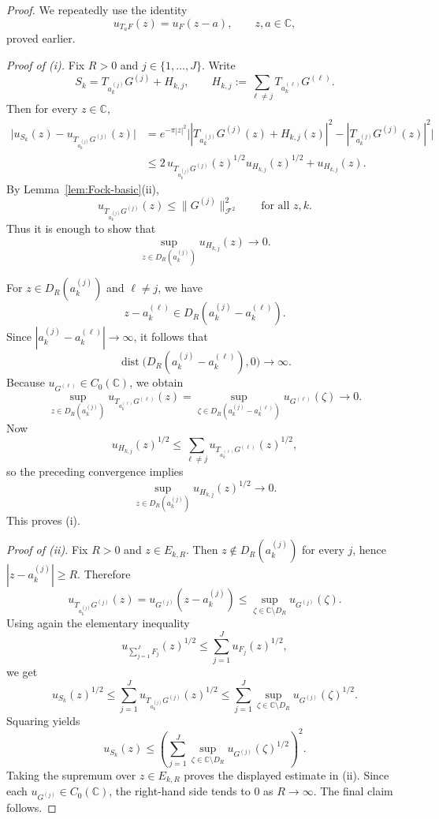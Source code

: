 \documentclass[a4paper,11pt,reqno]{amsart}
\numberwithin{equation}{section}
\theoremstyle{plain} %
\theoremstyle{definition} %
\theoremstyle{remark}
\newcommand{\C}{\mathbb{C}}
\begin{document}
\begin{proof}
We repeatedly use the identity
\[
u_{T_a F}(z)=u_F(z-a),
\qquad z,a\in \C,
\]
proved earlier.

\medskip
\noindent\emph{Proof of (i).}
Fix \(R>0\) and \(j\in\{1,\dots,J\}\). Write
\[
S_k=T_{a_k^{(j)}}G^{(j)}+H_{k,j},
\qquad
H_{k,j}:=\sum_{\ell\neq j} T_{a_k^{(\ell)}}G^{(\ell)}.
\]
Then for every \(z\in \C\),
\begin{align*}
\big|u_{S_k}(z)-u_{T_{a_k^{(j)}}G^{(j)}}(z)\big|
&=
e^{-\pi |z|^2}
\big||T_{a_k^{(j)}}G^{(j)}(z)+H_{k,j}(z)|^2-|T_{a_k^{(j)}}G^{(j)}(z)|^2\big| \\
&\le
2\,u_{T_{a_k^{(j)}}G^{(j)}}(z)^{1/2}u_{H_{k,j}}(z)^{1/2}
+u_{H_{k,j}}(z).
\end{align*}
By Lemma~\ref{lem:Fock-basic}(ii),
\[
u_{T_{a_k^{(j)}}G^{(j)}}(z)\le \|G^{(j)}\|_{\mathcal F^2}^2
\qquad \text{for all }z,k.
\]
Thus it is enough to show that
\[
\sup_{z\in D_R(a_k^{(j)})} u_{H_{k,j}}(z)\to 0.
\]

For \(z\in D_R(a_k^{(j)})\) and \(\ell\neq j\), we have
\[
z-a_k^{(\ell)}\in D_R(a_k^{(j)}-a_k^{(\ell)}).
\]
Since \(|a_k^{(j)}-a_k^{(\ell)}|\to\infty\), it follows that
\[
\operatorname{dist}\big(D_R(a_k^{(j)}-a_k^{(\ell)}),0\big)\to\infty.
\]
Because \(u_{G^{(\ell)}}\in C_0(\C)\), we obtain
\[
\sup_{z\in D_R(a_k^{(j)})} u_{T_{a_k^{(\ell)}}G^{(\ell)}}(z)
=
\sup_{\zeta\in D_R(a_k^{(j)}-a_k^{(\ell)})} u_{G^{(\ell)}}(\zeta)
\to 0.
\]
Now
\[
u_{H_{k,j}}(z)^{1/2}
\le
\sum_{\ell\neq j} u_{T_{a_k^{(\ell)}}G^{(\ell)}}(z)^{1/2},
\]
so the preceding convergence implies
\[
\sup_{z\in D_R(a_k^{(j)})} u_{H_{k,j}}(z)^{1/2}\to 0.
\]
This proves (i).

\medskip
\noindent\emph{Proof of (ii).}
Fix \(R>0\) and \(z\in E_{k,R}\). Then \(z\notin D_R(a_k^{(j)})\) for every
\(j\), hence \(|z-a_k^{(j)}|\ge R\). Therefore
\[
u_{T_{a_k^{(j)}}G^{(j)}}(z)
=
u_{G^{(j)}}(z-a_k^{(j)})
\le
\sup_{\zeta\in \C\setminus D_R}u_{G^{(j)}}(\zeta).
\]
Using again the elementary inequality
\[
u_{\sum_{j=1}^J F_j}(z)^{1/2}
\le \sum_{j=1}^J u_{F_j}(z)^{1/2},
\]
we get
\[
u_{S_k}(z)^{1/2}
\le
\sum_{j=1}^J u_{T_{a_k^{(j)}}G^{(j)}}(z)^{1/2}
\le
\sum_{j=1}^J \sup_{\zeta\in \C\setminus D_R}u_{G^{(j)}}(\zeta)^{1/2}.
\]
Squaring yields
\[
u_{S_k}(z)
\le
\left(
\sum_{j=1}^J \sup_{\zeta\in \C\setminus D_R}u_{G^{(j)}}(\zeta)^{1/2}
\right)^2.
\]
Taking the supremum over \(z\in E_{k,R}\) proves the displayed estimate in (ii).
Since each \(u_{G^{(j)}}\in C_0(\C)\), the right-hand side tends to \(0\) as
\(R\to\infty\). The final claim follows.
\end{proof}
\end{document}

